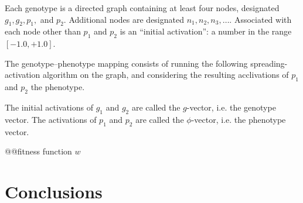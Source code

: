 \documentclass[letterpaper]{article}
\newcommand{\gv}{$g$-vector}
\newcommand{\phv}{$\phi$-vector}
\begin{document}
Each genotype is a directed graph containing at least four nodes, designated
$g_1, g_2, p_1,$ and $p_2$. Additional nodes are designated $n_1, n_2, n_3,
\ldots$. Associated with each node other than $p_1$ and $p_2$ is an ``initial
activation'': a number in the range $[-1.0,+1.0]$.

The genotype--phenotype mapping consists of running the following
spreading-activation algorithm on the graph, and considering the resulting
acclivations of $p_1$ and $p_2$ the phenotype.

The initial activations of $g_1$ and $g_2$ are called the \gv, i.e. the
genotype vector. The activations of $p_1$ and $p_2$ are called the
\phv, i.e. the phenotype vector.

@@fitness function $w$

\section{Conclusions}




\end{document}

